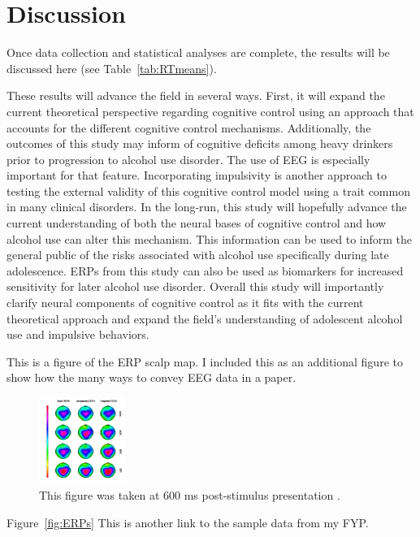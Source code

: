 \section{Discussion}
Once data collection and statistical analyses are complete, the results will be discussed here (see Table~\ref{tab:RTmeans}). 

These results will advance the field in several ways. First, it will expand the current theoretical perspective regarding cognitive control using an approach that accounts for the different cognitive control mechanisms. Additionally, the outcomes of this study may inform of cognitive deficits among heavy drinkers prior to progression to alcohol use disorder. The use of EEG is especially important for that feature. Incorporating impulsivity is another approach to testing the external validity of this cognitive control model using a trait common in many clinical disorders. In the long-run, this study will hopefully advance the current understanding of both the neural bases of cognitive control and how alcohol use can alter this mechanism. This information can be used to inform the general public of the risks associated with alcohol use specifically during late adolescence. ERPs from this study can also be used as biomarkers for increased sensitivity for later alcohol use disorder. Overall this study will importantly clarify neural components of cognitive control as it fits with the current theoretical approach and expand the field's understanding of adolescent alcohol use and impulsive behaviors. 

This is a figure of the ERP scalp map. I included this as an additional figure to show how the many ways to convey EEG data in a paper. 

\begin{figure}     \centering       
\includegraphics[width=0.25\textwidth]{scalpfig_copy}
\caption{\label{fig:latbrain} This figure was taken at 600 ms post-stimulus presentation .}
\end{figure}

Figure~\ref{fig:ERPs} This is another link to the sample data from my FYP.
